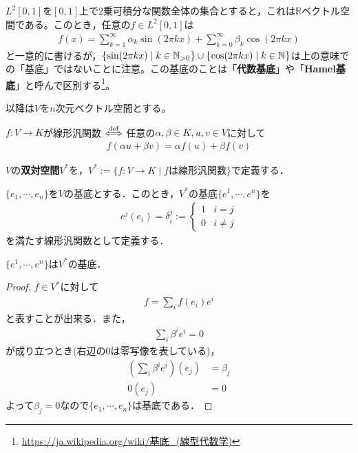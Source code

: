 \documentclass[uplatex]{jsarticle}
\begin{document}
 $L^{2}[0,1]$を$[0,1]$上で2乗可積分な関数全体の集合とすると，これは$\mathbb{R}$ベクトル空間である。このとき，任意の$f \in L^{2}[0,1]$は
\begin{align}
  f(x) = \sum_{k=1}^{\infty} \alpha_{k} \sin (2 \pi k x) + \sum_{k=0}^{\infty} \beta_{k} \cos (2 \pi k x)
\end{align}
と一意的に書けるが，$\Set{\hspace{-1.8pt} \sin (2 \pi k x) | k \in \mathbb{N}_{>0} \hspace{-1.8pt}} \cup \Set{\hspace{-1.8pt} \cos (2 \pi k x) | k \in \mathbb{N} \hspace{-1.8pt}}$は上の意味での「基底」ではないことに注意。この基底のことは「\textbf{代数基底}」や「\textbf{Hamel基底}」と呼んで区別する\footnote{\url{https://ja.wikipedia.org/wiki/基底_(線型代数学)}}。

以降は$V$を$n$次元ベクトル空間とする。

\sukima{}

\begin{teigi}[線形汎関数]
  $f\colon V\to K$が線形汎関数 $\overset{\mathrm{def}}{\Longleftrightarrow}$ 任意の$\alpha,\beta \in K, u,v \in V$に対して
  \begin{align*}
    f(\alpha u+\beta v) = \alpha f(u) + \beta f(v)
  \end{align*}
\end{teigi}
\begin{teigi}[双対空間]
  $V$の\textbf{双対空間}$V^\ast$を，$V^\ast := \{ f\colon V\to K \mid fは線形汎関数 \}$で定義する．
\end{teigi}
\begin{teigi}[双対基底]
  $\{e_1,\cdots,e_n\}$を$V$の基底とする．このとき，$V^\ast$の基底$\{e^1,\cdots,e^n\}$を
  \begin{align*}
    e^j(e_i) = \delta_i^j := \begin{cases}
      1 & i=j \\
      0 & i\neq j
    \end{cases}
  \end{align*}
  を満たす線形汎関数として定義する．
\end{teigi}
\begin{prop}
  $\{e^1,\cdots,e^n\}$は$V^\ast$の基底．
\end{prop}
\begin{proof}
  $f\in V^\ast$に対して
  \begin{align*}
    f = \sum_i f(e_i) e^i
  \end{align*}
  と表すことが出来る．また，
  \begin{align*}
    \sum_i \beta^i e^i = 0
  \end{align*}
  が成り立つとき(右辺の0は零写像を表している)，
  \begin{align*}
    \left(\sum_i \beta^i e^i \right) (e_j) & = \beta_j \\
    0(e_j) & = 0 
  \end{align*}
  よって$\beta_j = 0$なので$\{e_1,\cdots,e_n\}$は基底である．
\end{proof}
\end{document}
